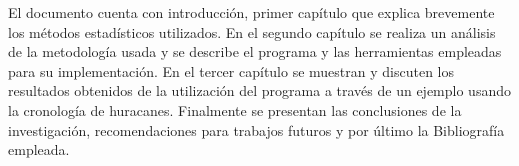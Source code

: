 \begin{introduction}
El documento cuenta con introducción, primer capítulo que explica brevemente los métodos estadísticos utilizados. En el segundo capítulo se realiza un análisis de la metodología usada y se describe el programa y las herramientas empleadas para su implementación. En el tercer capítulo se muestran y discuten los resultados obtenidos de la utilización del  programa a través de un ejemplo usando la cronología de huracanes. Finalmente se presentan las conclusiones de la investigación, recomendaciones para trabajos futuros y por último la Bibliografía empleada.


\end{introduction}
